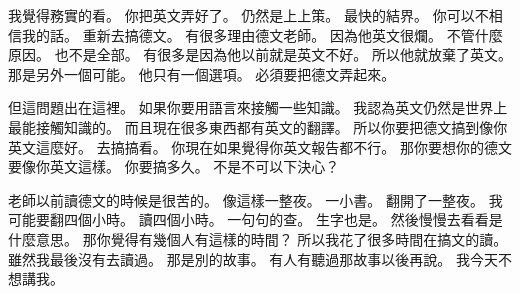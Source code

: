 \hypertarget{w01:cue:3978}{}我覺得務實的看。
\hypertarget{w01:cue:3979}{}你把英文弄好了。
\hypertarget{w01:cue:3980}{}仍然是上上策。
\hypertarget{w01:cue:3981}{}最快的結界。
\hypertarget{w01:cue:3982}{}你可以不相信我的話。
\hypertarget{w01:cue:3983}{}重新去搞德文。
\hypertarget{w01:cue:3984}{}有很多理由德文老師。
\hypertarget{w01:cue:3985}{}因為他英文很爛。
\hypertarget{w01:cue:3986}{}不管什麼原因。
\hypertarget{w01:cue:3987}{}也不是全部。
\hypertarget{w01:cue:3988}{}有很多是因為他以前就是英文不好。
\hypertarget{w01:cue:3989}{}所以他就放棄了英文。
\hypertarget{w01:cue:3990}{}那是另外一個可能。
\hypertarget{w01:cue:3991}{}他只有一個選項。
\hypertarget{w01:cue:3992}{}必須要把德文弄起來。

\hypertarget{w01:cue:3993}{}但這問題出在這裡。
\hypertarget{w01:cue:3994}{}如果你要用語言來接觸一些知識。
\hypertarget{w01:cue:3995}{}我認為英文仍然是世界上最能接觸知識的。
\hypertarget{w01:cue:3996}{}而且現在很多東西都有英文的翻譯。
\hypertarget{w01:cue:3997}{}所以你要把德文搞到像你英文這麼好。
\hypertarget{w01:cue:3998}{}去搞搞看。
\hypertarget{w01:cue:3999}{}你現在如果覺得你英文報告都不行。
\hypertarget{w01:cue:4000}{}那你要想你的德文要像你英文這樣。
\hypertarget{w01:cue:4001}{}你要搞多久。
\hypertarget{w01:cue:4002}{}不是不可以下決心？

\hypertarget{w01:cue:4003}{}老師以前讀德文的時候是很苦的。
\hypertarget{w01:cue:4004}{}像這樣一整夜。
\hypertarget{w01:cue:4005}{}一小書。
\hypertarget{w01:cue:4006}{}翻開了一整夜。
\hypertarget{w01:cue:4007}{}我可能要翻四個小時。
\hypertarget{w01:cue:4008}{}讀四個小時。
\hypertarget{w01:cue:4009}{}一句句的查。
\hypertarget{w01:cue:4010}{}生字也是。
\hypertarget{w01:cue:4011}{}然後慢慢去看看是什麼意思。
\hypertarget{w01:cue:4012}{}那你覺得有幾個人有這樣的時間？
\hypertarget{w01:cue:4013}{}所以我花了很多時間在搞文的讀。
\hypertarget{w01:cue:4014}{}雖然我最後沒有去讀過。
\hypertarget{w01:cue:4015}{}那是別的故事。
\hypertarget{w01:cue:4016}{}有人有聽過那故事以後再說。
\hypertarget{w01:cue:4017}{}我今天不想講我。

